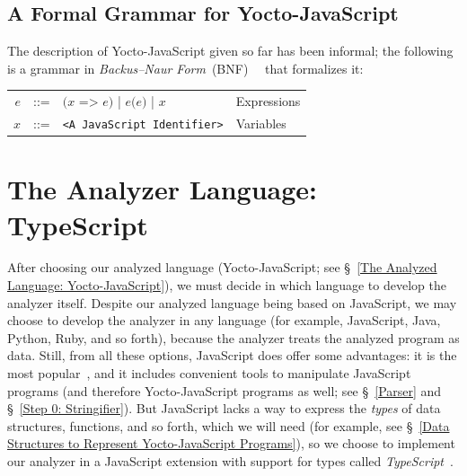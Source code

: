 \documentclass[12pt, oneside]{book}
\begin{document}
\begin{mdframed}[frametitle = {Advanced}]
\subsection{A Formal Grammar for Yocto-JavaScript}
\label{A Formal Grammar for Yocto-JavaScript}

The description of Yocto-JavaScript given so far has been informal; the following is a grammar in \emph{Backus–Naur Form}~(BNF)~\cite{bnf}~\cite[§~4.2]{dragon-book} that formalizes it:

\begin{center}
\begin{tabular}{rcll}
$e$ & ::= & $\texttt{(}x\texttt{ => }e\texttt{)}$ | $e\texttt{(}e\texttt{)}$ | $x$ & Expressions \\
$x$ & ::= & \texttt{<A JavaScript Identifier>} & Variables \\
\end{tabular}
\end{center}

\end{mdframed}

\section{The Analyzer Language: TypeScript}
\label{The Analyzer Language: TypeScript}

After choosing our analyzed language (Yocto-JavaScript; see §~\ref{The Analyzed Language: Yocto-JavaScript}), we must decide in which language to develop the analyzer itself. Despite our analyzed language being based on JavaScript, we may choose to develop the analyzer in any language (for example, JavaScript, Java, Python, Ruby, and so forth), because the analyzer treats the analyzed program as data. Still, from all these options, JavaScript does offer some advantages: it is the most popular~\cite{stack-overflow-developer-survey, jet-brains-developer-survey}, and it includes convenient tools to manipulate JavaScript programs (and therefore Yocto-JavaScript programs as well; see §~\ref{Parser} and §~\ref{Step 0: Stringifier}). But JavaScript lacks a way to express the \emph{types} of data structures, functions, and so forth, which we will need (for example, see §~\ref{Data Structures to Represent Yocto-JavaScript Programs}), so we choose to implement our analyzer in a JavaScript extension with support for types called \emph{TypeScript}~\cite{typescript, typescript-deep-dive, understanding-typescript}.
\end{document}
